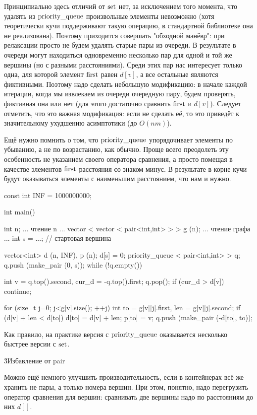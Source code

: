 Принципиально здесь отличий от $\rm set$ нет, за исключением того момента, что удалять из $\rm priority\_queue$ произвольные элементы невозможно (хотя теоретически кучи поддерживают такую операцию, в стандартной библиотеке она не реализована). Поэтому приходится совершать "обходной манёвр": при релаксации просто не будем удалять старые пары из очереди. В результате в очереди могут находиться одновременно несколько пар для одной и той же вершины (но с разными расстояниями). Среди этих пар нас интересует только одна, для которой элемент $\rm first$ равен $d[v]$, а все остальные являются фиктивными. Поэтому надо сделать небольшую модификацию: в начале каждой итерации, когда мы извлекаем из очереди очередную пару, будем проверять, фиктивная она или нет (для этого достаточно сравнить $\rm first$ и $d[v]$). Следует отметить, что это важная модификация: если не сделать её, то это приведёт к значительному ухудшению асимптотики (до $O(nm)$).

Ещё нужно помнить о том, что $\rm priority\_queue$ упорядочивает элементы по убыванию, а не по возрастанию, как обычно. Проще всего преодолеть эту особенность не указанием своего оператора сравнения, а просто помещая в качестве элементов $\rm first$ расстояния со знаком минус. В результате в корне кучи будут оказываться элементы с наименьшим расстоянием, что нам и нужно.

\code
const int INF = 1000000000;

int main() {
	int n;
	... чтение n ...
	vector < vector < pair<int,int> > > g (n);
	... чтение графа ...
	int s = ...; // стартовая вершина

	vector<int> d (n, INF),  p (n);
	d[s] = 0;
	priority_queue < pair<int,int> > q;
	q.push (make_pair (0, s));
	while (!q.empty()) {
		int v = q.top().second,  cur_d = -q.top().first;
		q.pop();
		if (cur_d > d[v])  continue;

		for (size_t j=0; j<g[v].size(); ++j) {
			int to = g[v][j].first,
				len = g[v][j].second;
			if (d[v] + len < d[to]) {
				d[to] = d[v] + len;
				p[to] = v;
				q.push (make_pair (-d[to], to));
			}
		}
	}
}
\endcode

Как правило, на практике версия с $\rm priority\_queue$ оказывается несколько быстрее версии с $\rm set$.

\h3{Избавление от pair}

Можно ещё немного улучшить производительность, если в контейнерах всё же хранить не пары, а только номера вершин. При этом, понятно, надо перегрузить оператор сравнения для вершин: сравнивать две вершины надо по расстояниям до них $d[]$.

